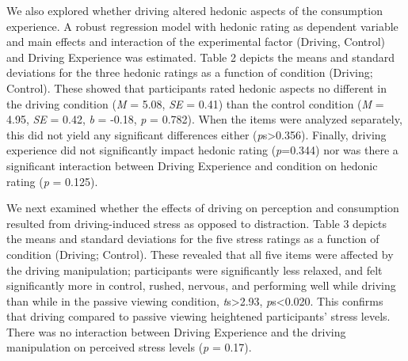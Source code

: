 \documentclass[authordate, empirical, issue]{jote-new-article}
\begin{document}
We also explored whether driving altered hedonic aspects of the consumption experience. A robust regression model with hedonic rating as dependent variable and main effects and interaction of the experimental factor (Driving, Control) and Driving Experience was estimated. Table 2 depicts the means and standard deviations for the three hedonic ratings as a function of condition (Driving; Control). These showed that participants rated hedonic aspects no different in the driving condition (\emph{M} = 5.08, \emph{SE} = 0.41) than the control condition (\emph{M }= 4.95, \emph{SE }= 0.42, \emph{b }= -0.18, \emph{p }= 0.782). When the items were analyzed separately, this did not yield any significant differences either (\emph{p}s>0.356). Finally, driving experience did not significantly impact hedonic rating (\emph{p}=0.344) nor was there a significant interaction between Driving Experience and condition on hedonic rating (\emph{p }= 0.125).



We next examined whether the effects of driving on perception and consumption resulted from driving-induced stress as opposed to distraction. Table 3 depicts the means and standard deviations for the five stress ratings as a function of condition (Driving; Control). These revealed that all five items were affected by the driving manipulation; participants were significantly less relaxed, and felt significantly more in control, rushed, nervous, and performing well while driving than while in the passive viewing condition, \emph{t}s>2.93, \emph{p}s<0.020. This confirms that driving compared to passive viewing heightened participants’ stress levels. There was no interaction between Driving Experience and the driving manipulation on perceived stress levels (\emph{p }= 0.17).
\end{document}
